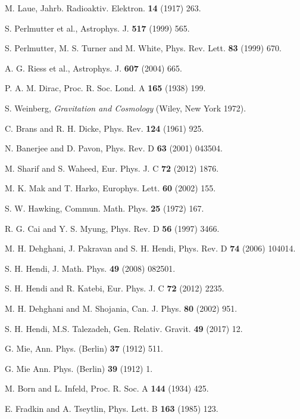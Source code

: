 \documentclass[aps,onecolumn ]{revtex4}
\begin{document}
\begin{thebibliography}{99}

 M. Laue, Jahrb. Radioaktiv. Elektron. \textbf{14} (1917) 263.

 S. Perlmutter et al., Astrophys. J.
\textbf{517} (1999) 565.

 S. Perlmutter, M. S. Turner and M. White, Phys. Rev. Lett.
\textbf{83} (1999) 670.

 A. G. Riess et al., Astrophys. J. \textbf{607} (2004) 665.

 P. A. M. Dirac, Proc. R. Soc. Lond. A \textbf{165} (1938) 199.

 S. Weinberg, \emph{Gravitation and Cosmology} (Wiley, New York
1972).

 C. Brans and R. H. Dicke, Phys. Rev. \textbf{124} (1961) 925.

 N. Banerjee and D. Pavon, Phys. Rev. D \textbf{63} (2001)
043504.

 M. Sharif and S. Waheed, Eur. Phys. J. C \textbf{72} (2012)
1876.

 M. K. Mak and T. Harko, Europhys. Lett. \textbf{60} (2002) 155.

 S. W. Hawking, Commun. Math. Phys. \textbf{25} (1972) 167.

 R. G. Cai and Y. S. Myung, Phys. Rev. D \textbf{56}
(1997) 3466.

 M. H. Dehghani, J. Pakravan and S. H. Hendi, Phys. Rev. D
\textbf{74} (2006) 104014.

 S. H. Hendi, J. Math. Phys. \textbf{49} (2008)
082501.

 S. H. Hendi and R. Katebi, Eur. Phys. J. C \textbf{72} (2012)
2235.

 M. H. Dehghani and M. Shojania, Can. J. Phys. \textbf{80} (2002) 951.

 S. H. Hendi, M.S. Talezadeh, Gen. Relativ. Gravit. \textbf{49} (2017) 12.

 G. Mie, Ann. Phys. (Berlin) \textbf{37} (1912) 511.

 G. Mie Ann. Phys. (Berlin) \textbf{39} (1912) 1.

 M. Born and L. Infeld, Proc. R. Soc. A \textbf{144} (1934) 425.

 E. Fradkin and A. Tseytlin, Phys. Lett. B
\textbf{163} (1985) 123.


\end{thebibliography}
\end{document}
